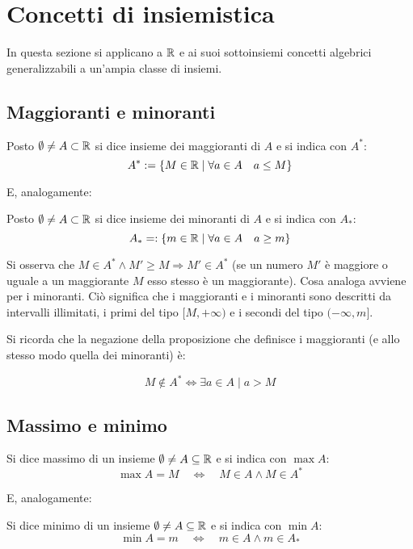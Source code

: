 \section{Concetti di insiemistica}
In questa sezione si applicano a $\mathbb{R}$ e ai suoi sottoinsiemi concetti algebrici generalizzabili a un'ampia classe di insiemi.

\subsection{Maggioranti e minoranti}
\begin{defin}
	Posto $\emptyset\neq A\subset\mathbb{R}$ si dice insieme dei maggioranti di $A$ e si indica con $A^*$:
	\[
		A^*:=\{M\in\mathbb{R}\mid\forall a\in A\quad a\leq M\}
	\]
\end{defin}
E, analogamente:
\begin{defin}
	Posto $\emptyset\neq A\subset\mathbb{R}$ si dice insieme dei minoranti di $A$ e si indica con $A_*$:
	\[
		A_*=:\{m\in\mathbb{R}\mid\forall a\in A\quad a\geq m\}
	\]
\end{defin}
Si osserva che $M\in A^*\land M'\geq M\Rightarrow M'\in A^*$ (se un numero $M'$ è maggiore o uguale a un maggiorante $M$ esso stesso è un maggiorante). Cosa analoga avviene per i minoranti. Ciò significa che i maggioranti e i minoranti sono descritti da intervalli illimitati, i primi del tipo $[M,+\infty)$ e i secondi del tipo $(-\infty,m]$.

Si ricorda che la negazione della proposizione che definisce i maggioranti (e allo stesso modo quella dei minoranti) è:
\begin{propo}
	\[
		M\notin A^*\iff\exists a\in A\mid a>M
	\]
\end{propo}


\subsection{Massimo e minimo}
\begin{defin}
	Si dice massimo di un insieme $\emptyset\neq A\subseteq\mathbb{R}$ e si indica con $\max A$:
	\[
		\max A=M\quad\Leftrightarrow\quad M\in A\land M\in A^*
	\]
\end{defin}
E, analogamente:
\begin{defin}
	Si dice minimo di un insieme $\emptyset\neq A\subseteq\mathbb{R}$ e si indica con $\min A$:
	\[
		\min A=m\quad\Leftrightarrow\quad m\in A\land m\in A_*
	\]
\end{defin}


